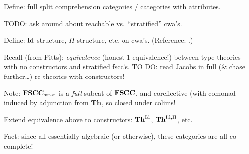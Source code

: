 Define: full split comprehension categories \cite[4.10]{jacobs:comprehension-categories} / categories with attributes.  \cite[\S 6.4]{pitts:categorical-logic}

TODO: ask around about reachable vs.\ ``stratified'' cwa's.

Define: $\mathrm{Id}$-structure, $\Pi$-structure, etc. on cwa's.  (Reference: \cite{awodey-warren}.)


Recall (from Pitts): \emph{equivalence} (honest 1-equivalence!) between type theories with no constructors and stratified fscc's.  TO DO: read Jacobs in full (\& chase further\ldots) re theories with constructors!

Note: $\mathbf{FSCC}_{\textrm{strat}}$ is a \emph{full} subcat of $\mathbf{FSCC}$, and coreflective (with comonad induced by adjunction from $\mathbf{Th}$, so closed under colims!

Extend equivalence above to constructors: $\mathbf{Th}^{\mathrm{Id}}$, $\mathbf{Th}^{\mathrm{Id},\Pi}$, etc.  

Fact: since all essentially algebraic (or otherwise), these categories are all co-complete!




% 



